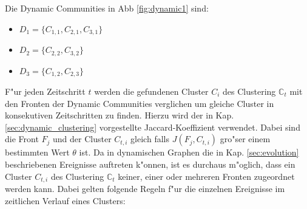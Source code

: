 \documentclass[journal]{vgtc}
\begin{document}
    Die Dynamic Communities in Abb \ref{fig:dynamic1} sind:
    \begin{itemize}
      \item $D_1 =\{C_{1,1}, C_{2,1}, C_{3,1}\}$
      \item $D_2 =\{C_{2,2}, C_{3,2}\}$
      \item $D_3 =\{C_{1,2}, C_{2,3}\}$
    \end{itemize}
    
    F"ur jeden Zeitschritt $t$ werden die gefundenen Cluster $C_i$ des Clustering $\mathbb{C}_t$ mit den Fronten der Dynamic Communities
    verglichen um gleiche Cluster in konsekutiven Zeitschritten zu finden. Hierzu wird der in Kap. \ref{sec:dynamic_clustering}
    vorgestellte Jaccard-Koeffizient verwendet. Dabei sind die
    Front $F_j$ und der Cluster $C_{t,i}$ gleich falls $J(F_j,C_{t,i})$ gro"ser einem bestimmten Wert $\theta$ ist. Da in dynamischen Graphen
    die in Kap. \ref{sec:evolution} beschriebenen Ereignisse auftreten k"onnen, ist es durchaus m"oglich, dass ein Cluster $C_{t,i}$ des
    Clustering $\mathbb{C}_t$ keiner, einer oder mehreren Fronten zugeordnet werden kann. Dabei gelten folgende Regeln f"ur die 
    einzelnen Ereignisse im zeitlichen Verlauf eines Clusters:
\end{document}
